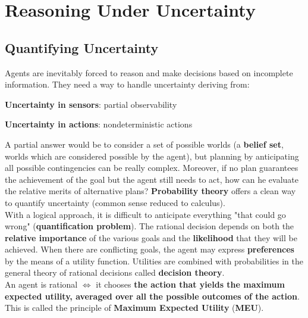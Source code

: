 \documentclass[10pt]{report}
\begin{document}
\section{Reasoning Under Uncertainty}
\subsection{Quantifying Uncertainty}
Agents are inevitably forced to reason and make decisions based on incomplete information. They need a way to handle uncertainty deriving from:
\begin{list}{}{}
	\item \textbf{Uncertainty in sensors}: partial observability
	\item \textbf{Uncertainty in actions}: nondeterministic actions
\end{list}
A partial answer would be to consider a set of possible worlds (a \textbf{belief set}, worlds which are considered possible by the agent), but planning by anticipating all possible contingencies can be really complex. Moreover, if no plan guarantees the achievement of the goal but the agent still needs to act, how can he evaluate the relative merits of alternative plans? \textbf{Probability theory} offers a clean way to quantify uncertainty (common sense reduced to calculus).\\
With a logical approach, it is difficult to anticipate everything "that could go wrong" (\textbf{quantification problem}). The rational decision depends on both the \textbf{relative importance} of the various goals and the \textbf{likelihood} that they will be achieved. When there are conflicting goals, the agent may express \textbf{preferences} by the means of a utility function. Utilities are combined with probabilities in the general theory of rational decisions called \textbf{decision theory}.\\
An agent is rational $\Leftrightarrow$ it chooses \textbf{the action that yields the maximum expected utility, averaged over all the possible outcomes of the action}. This is called the principle of \textbf{Maximum Expected Utility} (\textbf{MEU}).
\end{document}
